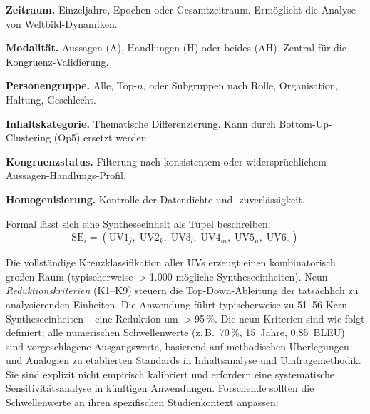 \documentclass[11pt,a4paper]{article}
\theoremstyle{definition}
\theoremstyle{plain}
\theoremstyle{remark}
\begin{document}
\begin{description}[leftmargin=*,labelwidth=1.5cm]
  \item[UV1] \textbf{Zeitraum.} Einzeljahre, Epochen oder Gesamtzeitraum. Erm\"oglicht die Analyse von Weltbild-Dynamiken.
  \item[UV2] \textbf{Modalit\"at.} Aussagen (A), Handlungen (H) oder beides (AH). Zentral f\"ur die Kongruenz-Validierung.
  \item[UV3] \textbf{Personengruppe.} Alle, Top-$n$, oder Subgruppen nach Rolle, Organisation, Haltung, Geschlecht.
  \item[UV4] \textbf{Inhaltskategorie.} Thematische Differenzierung. Kann durch Bottom-Up-Clustering (Op5) ersetzt werden.
  \item[UV5] \textbf{Kongruenzstatus.} Filterung nach konsistentem oder widerspr\"uchlichem Aussagen-Handlungs-Profil.
  \item[UV6] \textbf{Homogenisierung.} Kontrolle der Datendichte und -zuverl\"assigkeit.
\end{description}

Formal l\"asst sich eine Syntheseeinheit als Tupel beschreiben:
\begin{equation}
  \text{SE}_i = (\text{UV1}_j,\; \text{UV2}_k,\; \text{UV3}_l,\; \text{UV4}_m,\; \text{UV5}_n,\; \text{UV6}_o)
\end{equation}

Die vollst\"andige Kreuzklassifikation aller UVs erzeugt einen kombinatorisch gro\ss{}en Raum (typischerweise $>$1.000 m\"ogliche Syntheseeinheiten). Neun \emph{Reduktionskriterien} (K1--K9) steuern die Top-Down-Ableitung der tats\"achlich zu analysierenden Einheiten. Die Anwendung f\"uhrt typischerweise zu 51--56 Kern-Syntheseeinheiten -- eine Reduktion um $>$95\,\%. Die neun Kriterien sind wie folgt definiert; alle numerischen Schwellenwerte (z.\,B.\ 70\,\%, 15~Jahre, 0,85~BLEU) sind vorgeschlagene Ausgangswerte, basierend auf methodischen \"Uberlegungen und Analogien zu etablierten Standards in Inhaltsanalyse und Umfragemethodik. Sie sind explizit nicht empirisch kalibriert und erfordern eine systematische Sensitivit\"atsanalyse in k\"unftigen Anwendungen. Forschende sollten die Schwellenwerte an ihren spezifischen Studienkontext anpassen:
\end{document}

